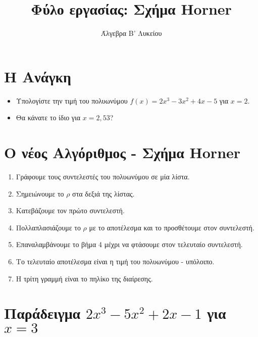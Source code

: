 \documentclass[a4paper,12pt]{article}
\title{\textbf{Φύλο εργασίας: Σχήμα Horner}}
\author{Άλγεβρα Β' Λυκείου}
\date{}
\begin{document}
\maketitle

\section{Η Ανάγκη}
\begin{itemize}
  \item Υπολογίστε την τιμή του πολυωνύμου $f(x) = 2x^3 - 3x^2 + 4x - 5$ για $x = 2$.

        \vspace{1cm}
        \dotfill
  \item Θα κάνατε το ίδιο για $x = 2,53$?
\end{itemize}

\section*{Ο νέος Αλγόριθμος - Σχήμα Horner}
\begin{enumerate}
  \item Γράφουμε τους συντελεστές του πολυωνύμου σε μία λίστα.
  \item Σημειώνουμε το $ρ$ στα δεξιά της λίστας.
  \item Κατεβάζουμε τον πρώτο συντελεστή.
  \item Πολλαπλασιάζουμε το $ρ$ με το αποτέλεσμα και το προσθέτουμε στον συντελεστή.
  \item Επαναλαμβάνουμε το βήμα 4 μέχρι να φτάσουμε στον τελευταίο συντελεστή.
  \item Το τελευταίο αποτέλεσμα είναι η τιμή του πολυωνύμου - υπόλοιπο.
  \item Η τρίτη γραμμή είναι το πηλίκο της διαίρεσης.
\end{enumerate}

\section*{Παράδειγμα ${2x^3-5x^2+2x-1}$ για $x = 3$}

 \hspace{1cm}
 \hspace{1cm}
 \hspace{1cm} \vspace{1cm}
\end{document}
